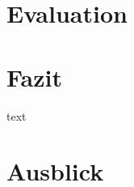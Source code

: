     \newpage
    \chapter{Evaluation}
    \chapter{Fazit}\label{ch:fazit}
    text

    \chapter{Ausblick}\label{ch:ausblick}

%

%

    \backmatter
    \listoftables
    \listoffigures

    
    

    \appendix




%
%